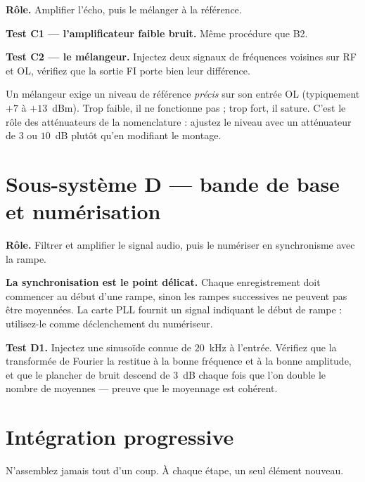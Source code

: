 \textbf{Rôle.} Amplifier l'écho, puis le mélanger à la référence.

\textbf{Test C1 --- l'amplificateur faible bruit.} Même procédure que B2.

\textbf{Test C2 --- le mélangeur.} Injectez deux signaux de fréquences voisines
sur RF et OL, vérifiez que la sortie FI porte bien leur différence.

\begin{attention}
Un mélangeur exige un niveau de référence \emph{précis} sur son entrée OL
(typiquement $+7$ à $+13$~dBm). Trop faible, il ne fonctionne pas ; trop fort,
il sature. C'est le rôle des atténuateurs de la nomenclature : ajustez le
niveau avec un atténuateur de $3$ ou $10$~dB plutôt qu'en modifiant le montage.
\end{attention}

\section{Sous-système D --- bande de base et numérisation}

\textbf{Rôle.} Filtrer et amplifier le signal audio, puis le numériser en
synchronisme avec la rampe.

\textbf{La synchronisation est le point délicat.} Chaque enregistrement doit
commencer au début d'une rampe, sinon les rampes successives ne peuvent pas être
moyennées. La carte PLL fournit un signal indiquant le début de rampe :
utilisez-le comme déclenchement du numériseur.

\textbf{Test D1.} Injectez une sinusoïde connue de $20$~kHz à l'entrée. Vérifiez
que la transformée de Fourier la restitue à la bonne fréquence et à la bonne
amplitude, et que le plancher de bruit descend de $3$~dB chaque fois que l'on
double le nombre de moyennes --- preuve que le moyennage est cohérent.

\section{Intégration progressive}

N'assemblez jamais tout d'un coup. À chaque étape, un seul élément nouveau.

